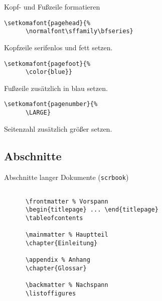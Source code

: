 \begin{frame}[fragile]{Kopf- und Fußzeile formatieren}
  \begin{lstlisting}[gobble=4]
    \setkomafont{pagehead}{%
      \normalfont\sffamily\bfseries}
  \end{lstlisting}
  Kopfzeile serifenlos und fett setzen.

  \xxx

  \begin{lstlisting}[gobble=4]
    \setkomafont{pagefoot}{%
      \color{blue}}
  \end{lstlisting}
  Fußzeile \alert{zusätzlich} in blau setzen.

  \xxx

  \begin{lstlisting}[gobble=4]
    \setkomafont{pagenumber}{%
      \LARGE}
  \end{lstlisting}
  Seitenzahl \alert{zusätzlich} größer setzen.
\end{frame}


\subsection{Abschnitte}

\begin{frame}[fragile]{Abschnitte langer Dokumente (\lstinline-scrbook-)}
  \begin{lstlisting}[gobble=4]
    
      \frontmatter % Vorspann
      \begin{titlepage} ... \end{titlepage}
      \tableofcontents

      \mainmatter % Hauptteil
      \chapter{Einleitung}

      \appendix % Anhang
      \chapter{Glossar}
      
      \backmatter % Nachspann
      \listoffigures
    
  \end{lstlisting}
\end{frame}

